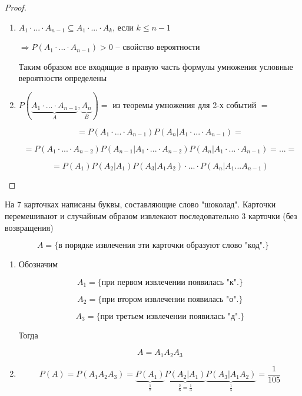 \documentclass[a4paper, 14pt]{report}
\begin{document}
\begin{proof}
    \begin{enumerate}
        \item $A_1 \cdot ... \cdot A_{n-1} \subseteq A_1 \cdot ... \cdot A_k$, если $k \le n-1$

            $\Rightarrow P(A_1 \cdot ... \cdot A_{n-1}) > 0$ -- свойство вероятности

            Таким образом все входящие в правую часть формулы умножения условные вероятности определены

        \item $P(\underbrace{A_1 \cdot ... \cdot A_{n-1}}_A, \underbrace{A_n}_B) = $ из теоремы умножения для 2-х событий $=$

            $$
            = P(A_1 \cdot ... \cdot A_{n-1})P(A_n|A_1 \cdot ... \cdot A_{n-1}) =
            $$

            $$
            = P(A_1 \cdot ... \cdot A_{n-2})P(A_{n-1}|A_1 \cdot ... \cdot A_{n-2})P(A_n | A_1 \cdot ... \cdot A_{n-1}) = ... =
            $$

            $$
            = P(A_1)P(A_2|A_1)P(A_3|A_1A_2) \cdot ... \cdot P(A_n|A_1...A_{n-1})
            $$
    \end{enumerate}
\end{proof}

На 7 карточках написаны буквы, составляющие слово "шоколад". Карточки перемешивают и случайным образом извлекают последовательно 3 карточки (без возвращения)

$$
A = \{ \text{в порядке извлечения эти карточки образуют слово "код".} \}
$$

\begin{enumerate}
    \item Обозначим

        $$
        A_1 = \{ \text{при первом извлечении появилась "к".} \}
        $$

        $$
        A_2 = \{ \text{при втором извлечении появилась "о".} \}
        $$

        $$
        A_3 = \{ \text{при третьем извлечении появилась "д".} \}
        $$

        Тогда

        $$
        A = A_1 A_2 A_3
        $$

    \item 
        $$
        P(A) = P(A_1A_2A_3) = \underbrace{P(A_1)}_{\frac{1}{7}} \underbrace{P(A_2|A_1)}_{\frac{2}{6} = \frac{1}{3}} \underbrace{P(A_3|A_1A_2)}_{\frac{1}{5}} = \frac{1}{105}
        $$

\end{enumerate}
\end{document}
